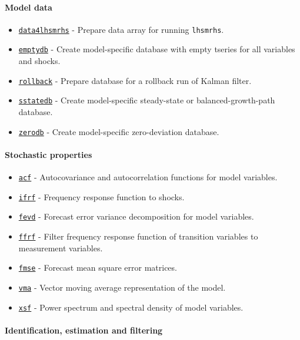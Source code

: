 \paragraph{Model data}

\begin{itemize}
\itemsep1pt\parskip0pt
\item
  \href{model/data4lhsmrhs}{\texttt{data4lhsmrhs}} - Prepare data array
  for running \texttt{lhsmrhs}.
\item
  \href{model/emptydb}{\texttt{emptydb}} - Create model-specific
  database with empty tseries for all variables and shocks.
\item
  \href{model/rollback}{\texttt{rollback}} - Prepare database for a
  rollback run of Kalman filter.
\item
  \href{model/sstatedb}{\texttt{sstatedb}} - Create model-specific
  steady-state or balanced-growth-path database.
\item
  \href{model/zerodb}{\texttt{zerodb}} - Create model-specific
  zero-deviation database.
\end{itemize}

\paragraph{Stochastic properties}

\begin{itemize}
\itemsep1pt\parskip0pt
\item
  \href{model/acf}{\texttt{acf}} - Autocovariance and autocorrelation
  functions for model variables.
\item
  \href{model/ifrf}{\texttt{ifrf}} - Frequency response function to
  shocks.
\item
  \href{model/fevd}{\texttt{fevd}} - Forecast error variance
  decomposition for model variables.
\item
  \href{model/ffrf}{\texttt{ffrf}} - Filter frequency response function
  of transition variables to measurement variables.
\item
  \href{model/fmse}{\texttt{fmse}} - Forecast mean square error
  matrices.
\item
  \href{model/vma}{\texttt{vma}} - Vector moving average representation
  of the model.
\item
  \href{model/xsf}{\texttt{xsf}} - Power spectrum and spectral density
  of model variables.
\end{itemize}

\paragraph{Identification, estimation and
filtering}

